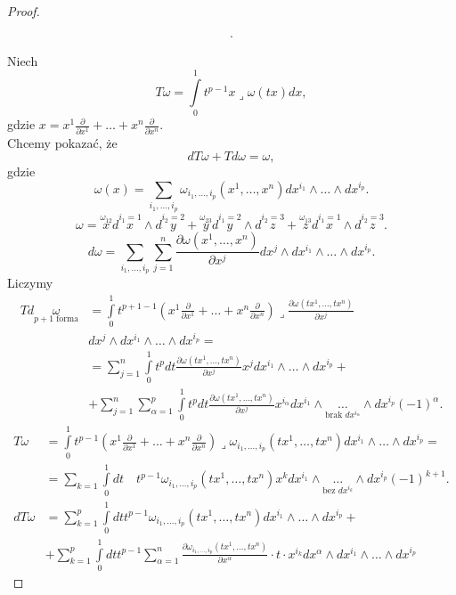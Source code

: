 \documentclass[../main.tex]{subfiles}
\begin{document}
\begin{proof}
\begin{przyklad}
\begin{align*}
    .\end{align*}
\end{przyklad}
Niech
\[
    T\omega = \int\limits_0^1 t^{p-1} x \lrcorner \omega(tx)dx
,\]
gdzie $x = x^1 \frac{\partial }{\partial x^1} + \ldots + x^n \frac{\partial }{\partial x^n} $.\\
Chcemy pokazać, że
\[
dT\omega + Td\omega = \omega
,\]
gdzie
\[
    \omega(x) = \sum_{i_1, \ldots, i_p}\omega_{i_1, \ldots, i_p}(x^1, \ldots, x^n)dx^{i_1}\land \ldots\land dx^{i_p}
.\]
\[
    \omega = \overset{\omega_{12}}{x} d\overset{i_1 = 1}{x}\land d\overset{i_2 = 2}{y} + \overset{\omega_{23}}{y}d\overset{i_1 = 2}{y}\land d\overset{i_2 = 3}{z} + \overset{\omega_{13}}{z}d\overset{i_1 = 1}{x}\land d\overset{i_2 = 3}{z}
.\]
\[
    d\omega = \sum_{i_1,\ldots,i_p}\sum_{j=1}^n \frac{\partial \omega(x^1,\ldots,x^n)}{\partial x^j} dx^j\land dx^{i_1}\land \ldots \land dx^{i_p}
.\]
Liczymy
\begin{align*}
    Td\underset{p+1\text{ forma}}{\omega} &= \int\limits_0^1t^{p+1-1}\left( x^1 \frac{\partial }{\partial x^1} + \ldots + x^n \frac{\partial }{\partial x^n}  \right)\lrcorner \frac{\partial \omega(tx^1,\ldots,tx^n)}{\partial x^j} \\
    &dx^j\land dx^{i_1}\land \ldots\land dx^{i_p} = \\
    &= \sum_{j=1}^n \int\limits_0^1 t^p dt\frac{\partial \omega(tx^1,\ldots,tx^n)}{\partial x^j}x^jdx^{i_1}\land \ldots\land dx^{i_p} +\\
    &+\sum_{j=1}^n\sum_{\alpha = 1}^p \int\limits_0^1 t^p dt \frac{\partial \omega(tx^1,\ldots,tx^n)}{\partial x^j}x^{i_\alpha}dx^{i_1}\land\underset{\text{brak }dx^{i_\alpha}}{\ldots} \land dx^{i_p}(-1)^{\alpha}
.\end{align*}
\begin{align*}
    T\omega &= \int\limits_0^1 t^{p-1} \left(x^1 \frac{\partial }{\partial x^1} + \ldots + x^n \frac{\partial }{\partial x^n} \right)\lrcorner \omega_{i_1,\ldots,i_p} (tx^1, \ldots, tx^n) dx^{i_1}\land \ldots\land dx^{i_p} = \\
    &= \sum_{k = 1}^{}\int\limits_0^1dt\quad t^{p-1} \omega_{i_1,\ldots,i_p}(tx^1,\ldots,tx^n)x^kdx^{i_1}\land \underset{\text{bez }dx^{i_k}}{\ldots}\land dx^{i_p}(-1)^{k+1}.\\
    dT\omega &= \sum_{k=1}^p \int\limits_0^1 dt t^{p-1} \omega_{i_1,\ldots,i_p}(tx^1,\ldots,tx^n)dx^{i_1}\land \ldots\land dx^{i_p} +\\
    &+\sum_{k=1}^p \int\limits_0^1 dt t^{p-1} \sum_{\alpha = 1}^n \frac{\partial \omega_{i_1,\ldots,i_p}(tx^1,\ldots,tx^n)}{\partial x^\alpha}\cdot t\cdot  x^{i_k}dx^\alpha\land dx^{i_1}\land \ldots\land dx^{i_p}

\end{align*}
\end{proof}
\end{document}
